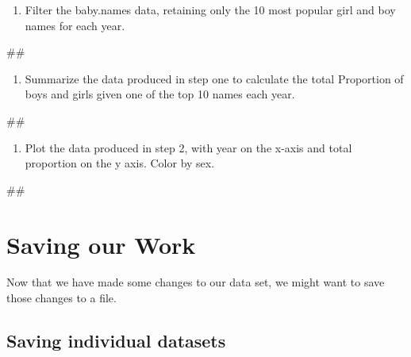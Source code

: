 \documentclass[]{book}
\newenvironment{Shaded}{\begin{snugshade}}{\end{snugshade}}
\newcommand{\NormalTok}[1]{#1}
\providecommand{\tightlist}{%
  \setlength{\itemsep}{0pt}\setlength{\parskip}{0pt}}
\begin{document}
\begin{enumerate}
\def\labelenumi{\arabic{enumi}.}
\tightlist
\item
  Filter the baby.names data, retaining only the 10 most popular girl
  and boy names for each year.
\end{enumerate}

\begin{Shaded}
\begin{Highlighting}[]
\NormalTok{##}
\end{Highlighting}
\end{Shaded}

\begin{enumerate}
\def\labelenumi{\arabic{enumi}.}
\setcounter{enumi}{1}
\tightlist
\item
  Summarize the data produced in step one to calculate the total
  Proportion of boys and girls given one of the top 10 names each year.
\end{enumerate}

\begin{Shaded}
\begin{Highlighting}[]
\NormalTok{##}
\end{Highlighting}
\end{Shaded}

\begin{enumerate}
\def\labelenumi{\arabic{enumi}.}
\setcounter{enumi}{2}
\tightlist
\item
  Plot the data produced in step 2, with year on the x-axis and total
  proportion on the y axis. Color by sex.
\end{enumerate}

\begin{Shaded}
\begin{Highlighting}[]
\NormalTok{##}
\end{Highlighting}
\end{Shaded}

\section{Saving our Work}\label{saving-our-work}

Now that we have made some changes to our data set, we might want to
save those changes to a file.

\subsection{Saving individual
datasets}\label{saving-individual-datasets}
\end{document}
